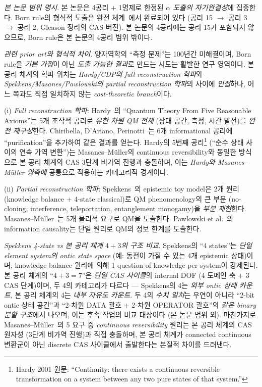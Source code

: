 \documentclass[entropy,article,submit,pdftex,oneauthor]{Definitions/mdpi}
\begin{document}
\emph{본 논문 범위 명시}. 본 논문은 4공리 + 1명제로 한정된 \emph{$\alpha$ 도출의 자기완결성}에 집중한다. Born rule의 형식적 도출은 완전 체계~\cite{han2026}에서 완료되어 있다 (공리 15 $\to$ 공리 3 $\to$ 공리 2, Gleason 정리의 CAS 버전). 본 논문의 4공리에는 공리 15가 포함되지 않으므로, Born rule은 본 논문의 4공리 범위 밖이다.

\emph{관련 prior art와 형식적 차이}. 양자역학의 ``측정 문제''는 100년간 미해결이며, Born rule을 \emph{기본 가정}이 아닌 \emph{도출 가능한 결과}로 만드는 시도는 활발한 연구 영역이다. 본 공리 체계의 학파 위치는 \emph{Hardy/CDP의 full reconstruction 학파}와 \emph{Spekkens/Masanes/Pawlowski의 partial reconstruction 학파}의 사이에 \emph{인접}하나, 어느 쪽과도 직접 일치하지 않는 \emph{cost-theoretic branch}이다.

(i) \emph{Full reconstruction 학파}: Hardy~\cite{hardy2001}의 ``Quantum Theory From Five Reasonable Axioms''는 5개 조작적 공리로 \emph{유한 차원 QM 전체} (상태 공간, 측정, 시간 발전)를 \emph{완전 재구성}한다. Chiribella, D'Ariano, Perinotti~\cite{cdp2011}는 6개 informational 공리에 ``purification''을 추가하여 같은 결과를 얻는다. Hardy의 5번째 공리\footnote{Hardy 2001 원문: ``Continuity: there exists a continuous reversible transformation on a system between any two pure states of that system.''} (``순수 상태 사이의 연속 가역 변환'')는 Masanes--M\"uller의 continuous reversibility와 동일한 방식으로 본 공리 체계의 CAS 3단계 비가역 진행과 충돌하며, 이는 \emph{Hardy와 Masanes--M\"uller 양측에} 공통으로 작용하는 카테고리적 경계이다.

(ii) \emph{Partial reconstruction 학파}: Spekkens~\cite{spekkens2007}의 epistemic toy model은 2개 원리 (knowledge balance + 4-state classical)로 QM phenomenology의 큰 부분 (no-cloning, interference, teleportation, entanglement monogamy)을 \emph{부분 재현}한다. Masanes--M\"uller~\cite{masanes2011}는 5개 물리적 요구로 QM을 도출한다. Pawlowski et al.~\cite{pawlowski2009}의 information causality는 단일 원리로 QM의 정보 한계를 도출한다.

\emph{Spekkens 4-state vs 본 공리 체계 $4+3$의 구조 비교}. Spekkens의 ``4 states''는 \emph{단일 element system의 ontic state space} (예: 동전이 가질 수 있는 4개 epistemic 상태)이며, knowledge balance 원리에 의해 1 question of knowledge per system이 강제된다. 본 공리 체계의 ``$4+3 = 7$''은 \emph{단일 CAS 사이클}의 internal DOF (4 도메인 축 + 3 CAS 단계)이며, 두 4의 카테고리가 다르다 — Spekkens의 4는 \emph{외부 ontic 상태 카운트}, 본 공리 체계의 4는 \emph{내부 자유도 카운트}. 두 4의 \emph{수치 일치}는 우연이 아니라 ``2-bit ontic 상태 공간''과 ``2-차원 DATA 괄호 + 2-차원 OPERATOR 괄호''의 \emph{같은 binary 분할 구조}에서 나오며, 이는 후속 작업의 비교 대상이다 (본 논문 범위 외). 마찬가지로 Masanes--M\"uller~\cite{masanes2011}의 5 요구 중 \emph{continuous reversibility} 원리는 본 공리 체계의 CAS 원자성 (3단계 비가역 진행)과 직접 충돌하며, 본 공리 체계가 connected continuous 변환군이 아닌 discrete CAS 사이클에서 출발한다는 본질적 차이를 드러낸다.
\end{document}
